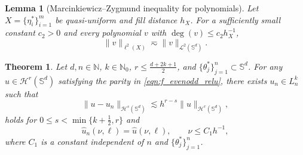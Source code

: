 \documentclass[10pt,a4paper]{amsart}
\newtheorem{theorem}{Theorem}
\newtheorem{lemma}{Lemma}
\def\NN{\mathbb{N}}
\def\SS{\mathbb{S}}
\begin{document}
\begin{lemma}[Marcinkiewicz–Zygmund inequality for polynomials]\label{lem_MZ_L2}
Let $X=\{\eta_i^*\}_{i=1}^m$ be quasi-uniform and fill distance $h_X$. For a sufficiently small constant $c_2>0$ and every polynomial $v$ with $\deg(v)\leq c_2h_X^{-1}$,
    \begin{equation}
        \|v\|_{\ell^2(X)}\eqsim\|v\|_{\mathcal{L}^2(\SS^d)}.
    \end{equation}
\end{lemma}

\begin{theorem}\label{thm:main_sphere}
Let $d,n\in\NN$, $k\in\NN_0$, $r\leq\frac{d+2k+1}{2}$, and $\{\theta_j^*\}_{j=1}^n\subset\SS^d$. For any $u\in\mathcal H^r(\SS^d)$ satisfying the parity in \eqref{eqn:f_evenodd_relu}, there exists $u_n\in L_n^k$ such that
\begin{equation}
\|u-u_n\|_{\mathcal H^s(\SS^d)}\lesssim h^{r-s}\|u\|_{\mathcal H^r(\SS^d)},
\end{equation}
holds for $0\leq s<\min\{k+\frac12,r\}$ and
\begin{equation}\label{eqn:trunc_equal}
\widehat u_n(\nu,\ell)=\widehat u(\nu,\ell),\qquad \nu\leq C_1 h^{-1},
\end{equation}
where $C_1$ is a constant independent of $n$ and $\{\theta_j^*\}_{j=1}^n$.
\end{theorem}
\end{document}
